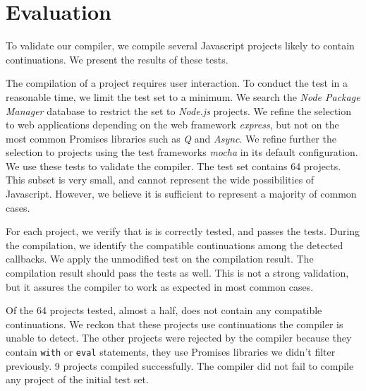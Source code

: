 \section{Evaluation} \label{section:evaluation}

To validate our compiler, we compile several Javascript projects likely to contain continuations.
We present the results of these tests.


The compilation of a project requires user interaction.
To conduct the test in a reasonable time, we limit the test set to a minimum.
We search the \textit{Node Package Manager} database to restrict the set to \textit{Node.js} projects.
We refine the selection to web applications depending on the web framework \textit{express}, but not on the most common Promises libraries such as \textit{Q} and \textit{Async}.
We refine further the selection to projects using the test frameworks \textit{mocha} in its default configuration.
We use these tests to validate the compiler.
The test set contains 64 projects.
This subset is very small, and cannot represent the wide possibilities of Javascript.
However, we believe it is sufficient to represent a majority of common cases.


For each project, we verify that is is correctly tested, and passes the tests.
During the compilation, we identify the compatible continuations among the detected callbacks.
We apply the unmodified test on the compilation result.
The compilation result should pass the tests as well.
This is not a strong validation, but it assures the compiler to work as expected in most common cases.


Of the 64 projects tested, almost a half, does not contain any compatible continuations.
We reckon that these projects use continuations the compiler is unable to detect.
The other projects were rejected by the compiler because they contain \texttt{with} or \texttt{eval} statements, they use Promises libraries we didn't filter previously.
9 projects compiled successfully.
The compiler did not fail to compile any project of the initial test set.

